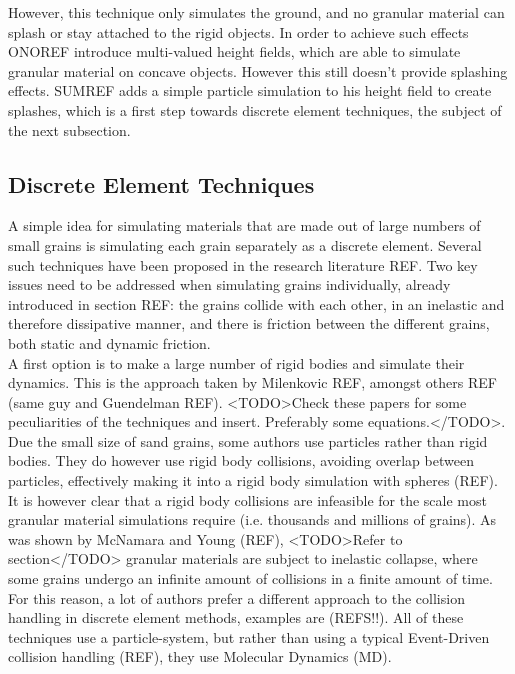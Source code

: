 However, this technique only simulates the ground, and no granular material can splash or stay attached to the rigid objects. In order to achieve such effects ONOREF introduce multi-valued height fields, which are able to simulate granular material on concave objects. However this still doesn't provide splashing effects. SUMREF adds a simple particle simulation to his height field to create splashes, which is a first step towards discrete element techniques, the subject of the next subsection.


\subsection{Discrete Element Techniques}
A simple idea for simulating materials that are made out of large numbers of small grains is simulating each grain separately as a discrete element. Several such techniques have been proposed in the research literature REF. Two key issues need to be addressed when simulating grains individually, already introduced in section REF: the grains collide with each other, in an inelastic and therefore dissipative manner, and there is friction between the different grains, both static and dynamic friction.\\

A first option is to make a large number of rigid bodies and simulate their dynamics. This is the approach taken by Milenkovic REF, amongst others REF (same guy and Guendelman REF). <TODO>Check these papers for some peculiarities of the techniques and insert. Preferably some equations.</TODO>. Due the small size of sand grains, some authors use particles rather than rigid bodies. They do however use rigid body collisions, avoiding overlap between particles, effectively making it into a rigid body simulation with spheres (REF).\\

It is however clear that a rigid body collisions are infeasible for the scale most granular material simulations require (i.e. thousands and millions of grains). As was shown by McNamara and Young (REF), <TODO>Refer to section</TODO> granular materials are subject to inelastic collapse, where some grains undergo an infinite amount of collisions in a finite amount of time. For this reason, a lot of authors prefer a different approach to the collision handling in discrete element methods, examples are (REFS!!). All of these techniques use a particle-system, but rather than using a typical Event-Driven collision handling (REF), they use Molecular Dynamics (MD). \\

